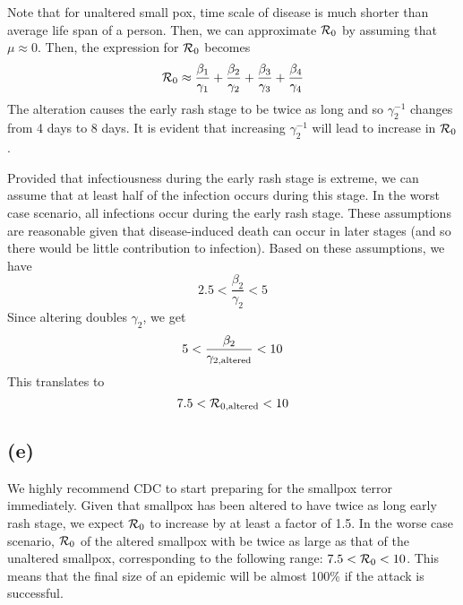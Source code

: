 \documentclass{article}
\begin{document}
Note that for unaltered small pox, time scale of disease is much shorter than average life span of a person. Then, we can approximate ${\cal R}_0$ by assuming that $\mu \approx 0$. Then, the expression for ${\cal R}_0$ becomes
$$
{\cal R}_0 \approx \frac{\beta_1}{\gamma_1} + \frac{\beta_2}{\gamma_2} + \frac{\beta_3}{\gamma_3} + \frac{\beta_4}{\gamma_4}
$$
The alteration causes the early rash stage to be twice as long and so $\gamma_2^{-1}$ changes from 4 days to 8 days.
It is evident that increasing $\gamma_2^{-1}$ will lead to increase in ${\cal R}_0$.

Provided that infectiousness during the early rash stage is extreme, we can assume that at least half of the infection occurs during this stage. In the worst case scenario, all infections occur during the early rash stage. These assumptions are reasonable given that disease-induced death can occur in later stages (and so there would be little contribution to infection).
Based on these assumptions, we have
$$
2.5 < \frac{\beta_2}{\gamma_2} < 5
$$
Since altering doubles $\gamma_2$, we get
$$
5 < \frac{\beta_2}{\gamma_{2,\tiny{\textrm{altered}}}} < 10
$$
This translates to
$$
7.5 < {\cal R}_{0, \tiny{\textrm{altered}}} <10
$$

\subsection*{(e)}

We highly recommend CDC to start preparing for the smallpox terror immediately. Given that smallpox has been altered to have twice as long early rash stage, we expect ${\cal R}_0$ to increase by at least a factor of 1.5. In the worse case scenario, ${\cal R}_0$ of the altered smallpox with be twice as large as that of the unaltered smallpox, corresponding to the following range: $7.5 < {\cal R}_0 < 10$.
This means that the final size of an epidemic will be almost 100\% if the attack is successful.
\end{document}
